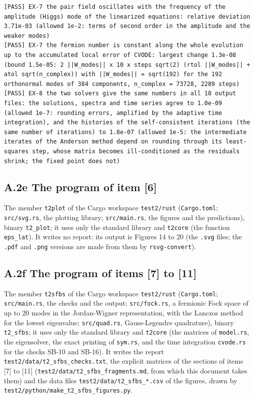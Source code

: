 \documentclass[
  10pt,
]{article}
\begin{document}
\begin{verbatim}
[PASS] EX-7 the pair field oscillates with the frequency of the amplitude (Higgs) mode of the linearized equations: relative deviation 3.71e-03 (allowed 1e-2: terms of second order in the amplitude and the weaker modes)
[PASS] EX-7 the fermion number is constant along the whole evolution up to the accumulated local error of CVODE: largest change 1.3e-08 (bound 1.5e-05: 2 ||W_modes|| x 10 x steps sqrt(2) (rtol ||W_modes|| + atol sqrt(n_complex)) with ||W_modes|| = sqrt(192) for the 192 orthonormal modes of 384 components, n_complex = 73728, 2289 steps)
[PASS] EX-8 the two solvers give the same numbers in all 18 output files: the solutions, spectra and time series agree to 1.0e-09 (allowed 1e-7: rounding errors, amplified by the adaptive time integration), and the histories of the self-consistent iterations (the same number of iterations) to 1.8e-07 (allowed 1e-5: the intermediate iterates of the Anderson method depend on rounding through its least-squares step, whose matrix becomes ill-conditioned as the residuals shrink; the fixed point does not)
\end{verbatim}

\hypertarget{a.2e-the-program-of-item-6}{%
\subsection{A.2e The program of item
{[}6{]}}\label{a.2e-the-program-of-item-6}}

The member \texttt{t2plot} of the Cargo workspace \texttt{test2/rust}
(\texttt{Cargo.toml}; \texttt{src/svg.rs}, the plotting library;
\texttt{src/main.rs}, the figures and the predictions), binary
\texttt{t2\_plot}; it uses only the standard library and \texttt{t2core}
(the function \texttt{eps\_lat}). It writes no report: its output is
Figures 14 to 20 (the \texttt{.svg} files; the \texttt{.pdf} and
\texttt{.png} versions are made from them by \texttt{rsvg-convert}).

\hypertarget{a.2f-the-program-of-items-7-to-11}{%
\subsection{A.2f The program of items {[}7{]} to
{[}11{]}}\label{a.2f-the-program-of-items-7-to-11}}

The member \texttt{t2sfbs} of the Cargo workspace \texttt{test2/rust}
(\texttt{Cargo.toml}; \texttt{src/main.rs}, the checks and the output;
\texttt{src/fock.rs}, a fermionic Fock space of up to 20 modes in the
Jordan-Wigner representation, with the Lanczos method for the lowest
eigenvalue; \texttt{src/quad.rs}, Gauss-Legendre quadrature), binary
\texttt{t2\_sfbs}; it uses only the standard library and \texttt{t2core}
(the matrices of \texttt{model.rs}, the eigensolver, the exact printing
of \texttt{sym.rs}, and the time integration \texttt{cvode.rs} for the
checks SB-10 and SB-16). It writes the report
\texttt{test2/data/t2\_sfbs\_checks.txt}, the explicit matrices of the
sections of items {[}7{]} to {[}11{]}
(\texttt{test2/data/t2\_sfbs\_fragments.md}, from which this document
takes them) and the data files \texttt{test2/data/t2\_sfbs\_*.csv} of
the figures, drawn by \texttt{test2/python/make\_t2\_sfbs\_figures.py}.
\end{document}
